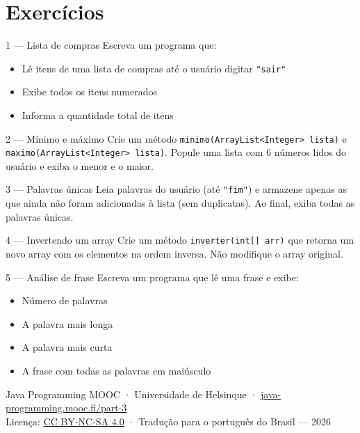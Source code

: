 \documentclass[12pt, a4paper]{article}
\newcommand{\code}[1]{\texttt{\color{javaDeep}#1}}
\begin{document}
\section{Exercícios}

\begin{exercicio}{1 --- Lista de compras}
Escreva um programa que:
\begin{itemize}
  \item Lê itens de uma lista de compras até o usuário digitar \code{"sair"}
  \item Exibe todos os itens numerados
  \item Informa a quantidade total de itens
\end{itemize}
\end{exercicio}

\begin{exercicio}{2 --- Mínimo e máximo}
Crie um método \code{minimo(ArrayList<Integer> lista)} e \code{maximo(ArrayList<Integer> lista)}.
Popule uma lista com 6 números lidos do usuário e exiba o menor e o maior.
\end{exercicio}

\begin{exercicio}{3 --- Palavras únicas}
Leia palavras do usuário (até \code{"fim"}) e armazene apenas as que ainda não foram adicionadas à lista (sem duplicatas). Ao final, exiba todas as palavras únicas.
\end{exercicio}

\begin{exercicio}{4 --- Invertendo um array}
Crie um método \code{inverter(int[] arr)} que retorna um novo array com os elementos na ordem inversa. Não modifique o array original.
\end{exercicio}

\begin{exercicio}{5 --- Análise de frase}
Escreva um programa que lê uma frase e exibe:
\begin{itemize}
  \item Número de palavras
  \item A palavra mais longa
  \item A palavra mais curta
  \item A frase com todas as palavras em maiúsculo
\end{itemize}
\end{exercicio}

\vfill
\begin{center}
  \small\color{gray}
  Java Programming MOOC · Universidade de Helsinque ·
  \href{https://java-programming.mooc.fi/part-3}{java-programming.mooc.fi/part-3}\\
  Licença: \href{https://creativecommons.org/licenses/by-nc-sa/4.0/}{CC BY-NC-SA 4.0} ·
  Tradução para o português do Brasil --- 2026
\end{center}
\end{document}
